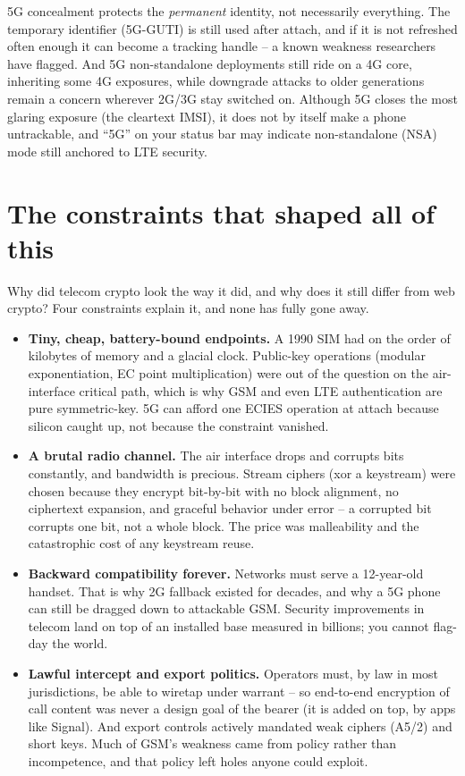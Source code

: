 \begin{trapbox}
5G concealment protects the \emph{permanent} identity, not necessarily everything. The temporary identifier (5G-GUTI) is still used after attach, and if it is not refreshed often enough it can become a tracking handle -- a known weakness researchers have flagged. And 5G non-standalone deployments still ride on a 4G core, inheriting some 4G exposures, while downgrade attacks to older generations remain a concern wherever 2G/3G stay switched on. Although 5G closes the most glaring exposure (the cleartext IMSI), it does not by itself make a phone untrackable, and ``5G'' on your status bar may indicate non-standalone (NSA) mode still anchored to LTE security.
\end{trapbox}

\section{The constraints that shaped all of this}
\label{ch29:constraints}

Why did telecom crypto look the way it did, and why does it still differ from web crypto? Four constraints explain it, and none has fully gone away.

\begin{itemize}
  \item \textbf{Tiny, cheap, battery-bound endpoints.} A 1990 SIM had on the order of kilobytes of memory and a glacial clock. Public-key operations (modular exponentiation, EC point multiplication) were out of the question on the air-interface critical path, which is why GSM and even LTE authentication are pure symmetric-key. 5G can afford one ECIES operation at attach because silicon caught up, not because the constraint vanished.
  \item \textbf{A brutal radio channel.} The air interface drops and corrupts bits constantly, and bandwidth is precious. Stream ciphers (xor a keystream) were chosen because they encrypt bit-by-bit with no block alignment, no ciphertext expansion, and graceful behavior under error -- a corrupted bit corrupts one bit, not a whole block. The price was malleability and the catastrophic cost of any keystream reuse.
  \item \textbf{Backward compatibility forever.} Networks must serve a 12-year-old handset. That is why 2G fallback existed for decades, and why a 5G phone can still be dragged down to attackable GSM. Security improvements in telecom land on top of an installed base measured in billions; you cannot flag-day the world.
  \item \textbf{Lawful intercept and export politics.} Operators must, by law in most jurisdictions, be able to wiretap under warrant -- so end-to-end encryption of call content was never a design goal of the bearer (it is added on top, by apps like Signal). And export controls actively mandated weak ciphers (A5/2) and short keys. Much of GSM's weakness came from policy rather than incompetence, and that policy left holes anyone could exploit.
\end{itemize}

